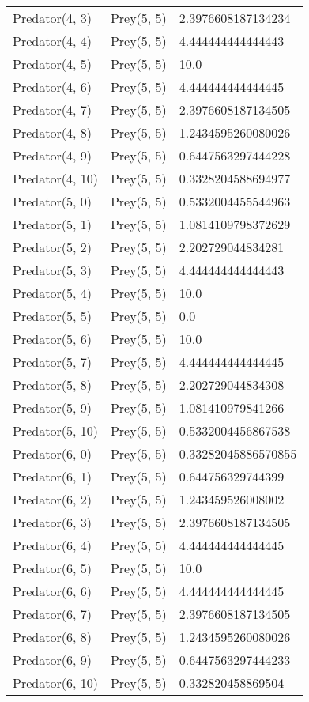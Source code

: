 \begin{longtable}{| p{} | p{} | p{} |}
Predator(4, 3) & Prey(5, 5) &2.3976608187134234\\
Predator(4, 4) & Prey(5, 5) &4.444444444444443\\
Predator(4, 5) & Prey(5, 5) &10.0\\
Predator(4, 6) & Prey(5, 5) &4.444444444444445\\
Predator(4, 7) & Prey(5, 5) &2.3976608187134505\\
Predator(4, 8) & Prey(5, 5) &1.2434595260080026\\
Predator(4, 9) & Prey(5, 5) &0.6447563297444228\\
Predator(4, 10) & Prey(5, 5) &0.3328204588694977\\
Predator(5, 0) & Prey(5, 5) &0.5332004455544963\\
Predator(5, 1) & Prey(5, 5) &1.0814109798372629\\
Predator(5, 2) & Prey(5, 5) &2.202729044834281\\
Predator(5, 3) & Prey(5, 5) &4.444444444444443\\
Predator(5, 4) & Prey(5, 5) &10.0\\
Predator(5, 5) & Prey(5, 5) &0.0\\
Predator(5, 6) & Prey(5, 5) &10.0\\
Predator(5, 7) & Prey(5, 5) &4.444444444444445\\
Predator(5, 8) & Prey(5, 5) &2.202729044834308\\
Predator(5, 9) & Prey(5, 5) &1.081410979841266\\
Predator(5, 10) & Prey(5, 5) &0.5332004456867538\\
Predator(6, 0) & Prey(5, 5) &0.33282045886570855\\
Predator(6, 1) & Prey(5, 5) &0.644756329744399\\
Predator(6, 2) & Prey(5, 5) &1.243459526008002\\
Predator(6, 3) & Prey(5, 5) &2.3976608187134505\\
Predator(6, 4) & Prey(5, 5) &4.444444444444445\\
Predator(6, 5) & Prey(5, 5) &10.0\\
Predator(6, 6) & Prey(5, 5) &4.444444444444445\\
Predator(6, 7) & Prey(5, 5) &2.3976608187134505\\
Predator(6, 8) & Prey(5, 5) &1.2434595260080026\\
Predator(6, 9) & Prey(5, 5) &0.6447563297444233\\
Predator(6, 10) & Prey(5, 5) &0.332820458869504\\

\end{longtable}
